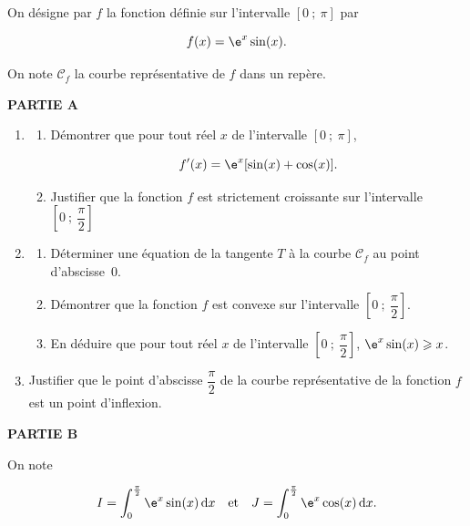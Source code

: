 \medskip

On désigne par $f$ la fonction définie sur l'intervalle $[0~;~\pi]$ par

\[f(x) = \e^x \sin (x).\]

On note $\mathcal{C}_f$ la courbe représentative de $f$ dans un repère.

\bigskip

\textbf{PARTIE A}

\medskip

\begin{enumerate}
\item
	\begin{enumerate}
		\item Démontrer que pour tout réel $x$ de l'intervalle $[0~;~\pi]$,\:

\[f'(x) = \e^x[\sin(x) + \cos(x)].\]

		\item Justifier que la fonction $f$ est strictement croissante sur l'intervalle 
$\left[0~;~\dfrac{\pi}{2}\right]$
	\end{enumerate}
\item
	\begin{enumerate}
		\item Déterminer une équation de la tangente $T$ à la courbe $\mathcal{C}_f$ au point d'abscisse~$0$.
		\item Démontrer que la fonction $f$ est convexe sur l'intervalle $\left[0~;~\dfrac{\pi}{2}\right]$.
		\item En déduire que pour tout réel $x$ de l'intervalle $\left[0~;~\dfrac{\pi}{2}\right]$,\: $\e^x \sin (x) \geqslant x$.
	\end{enumerate}
\item Justifier que le point d'abscisse $\dfrac{\pi}{2}$ de la courbe représentative de la fonction $f$ est un point d'inflexion.
\end{enumerate}

\bigskip

\textbf{PARTIE B}

\medskip


On note

\[I = \displaystyle\int_0^{\frac{\pi}{2}} \e^x \sin (x)\, \text{d}x\quad  \text{et}\quad J = \displaystyle\int_0^{\frac{\pi}{2}} \e^x \cos (x)\, \text{d}x.\]

\smallskip

